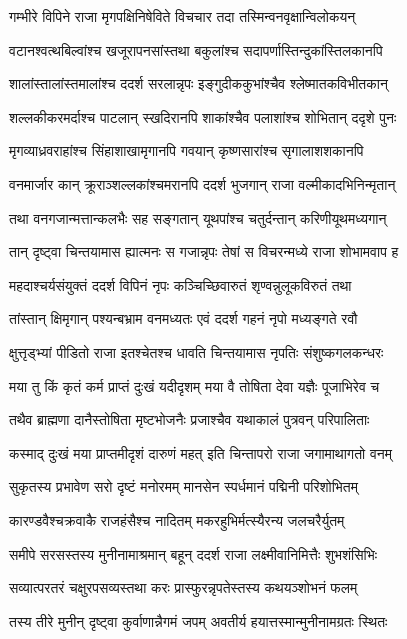 \twolineshloka
{गम्भीरे विपिने राजा मृगपक्षिनिषेविते}
{विचचार तदा तस्मिन्वनवृक्षान्विलोकयन्} %

\twolineshloka
{वटानश्वत्थबिल्वांश्च खजूरापनसांस्तथा}
{बकुलांश्च सदापर्णास्तिन्दुकांस्तिलकानपि} %

\twolineshloka
{शालांस्तालांस्तमालांश्च ददर्श सरलान्नृपः}
{इङ्गुदीककुभांश्चैव श्लेष्मातकविभीतकान्} %

\twolineshloka
{शल्लकीकरमर्दाश्च पाटलान् स्खदिरानपि}
{शाकांश्चैव पलाशांश्च शोभितान् ददृशे पुनः} %

\twolineshloka
{मृगव्याध्रवराहांश्च सिंहाशाखामृगानपि}
{गवयान् कृष्णसारांश्च सृगालाशशकानपि} %

\twolineshloka
{वनमार्जार कान् क्रूराञ्शल्लकांश्चमरानपि}
{ददर्श भुजगान् राजा वल्मीकादभिनिन्मृतान्} %

\twolineshloka
{तथा वनगजान्मत्तान्कलभैः सह सङ्गतान्}
{यूथपांश्च चतुर्दन्तान् करिणीयूथमध्यगान्} %

\twolineshloka
{तान् दृष्ट्वा चिन्तयामास ह्यात्मनः स गजान्नृपः}
{तेषां स विचरन्मध्ये राजा शोभामवाप ह} %

\twolineshloka
{महदाश्चर्यसंयुक्तं ददर्श विपिनं नृपः}
{कञ्चिच्छिवारुतं शृण्वन्नुलूकविरुतं तथा} %

\twolineshloka
{तांस्तान् क्षिमृगान् पश्यन्बभ्राम वनमध्यतः}
{एवं ददर्श गहनं नृपो मध्यङ्गते रवौ} %

\twolineshloka
{क्षुत्तृड्भ्यां पीडितो राजा इतश्चेतश्च धावति}
{चिन्तयामास नृपतिः संशुष्कगलकन्धरः} %

\twolineshloka
{मया तु किं कृतं कर्म प्राप्तं दुःखं यदीदृशम्}
{मया वै तोषिता देवा यज्ञैः पूजाभिरेव च} %

\twolineshloka
{तथैव ब्राह्मणा दानैस्तोषिता मृष्टभोजनैः}
{प्रजाश्चैव यथाकालं पुत्रवन् परिपालिताः} %

\twolineshloka
{कस्माद् दुःखं मया प्राप्तमीदृशं दारुणं महत्}
{इति चिन्तापरो राजा जगामाथागतो वनम्} %

\twolineshloka
{सुकृतस्य प्रभावेण सरो दृष्टं मनोरमम्}
{मानसेन स्पर्धमानं पद्मिनी परिशोभितम्} %

\twolineshloka
{कारण्डवैश्चक्रवाकै राजहंसैश्च नादितम्}
{मकरहुभिर्मत्स्यैरन्य जलचरैर्युतम्} %

\twolineshloka
{समीपे सरसस्तस्य मुनीनामाश्रमान् बहून्}
{ददर्श राजा लक्ष्मीवानिमित्तैः शुभशंसिभिः} %

\twolineshloka
{सव्यात्परतरं चक्षुरपसव्यस्तथा करः}
{प्रास्फुरन्नृपतेस्तस्य कथयञ्शोभनं फलम्} %

\twolineshloka
{तस्य तीरे मुनीन् दृष्ट्वा कुर्वाणान्नैगमं जपम्}
{अवतीर्य हयात्तस्मान्मुनीनामग्रतः स्थितः} %

